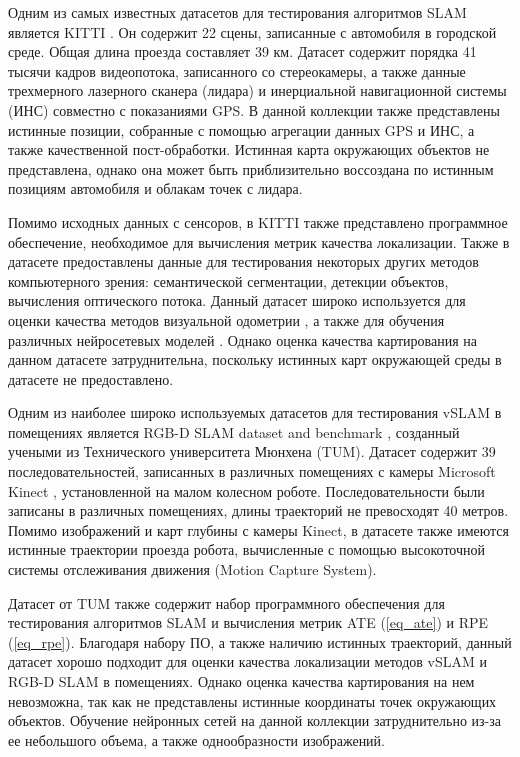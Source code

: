 \documentclass{mipt-thesis-ms}
\begin{document}
	Одним из самых известных датасетов для тестирования алгоритмов SLAM является KITTI \cite{geiger2012we}. Он содержит 22 сцены, записанные с автомобиля в городской среде. Общая длина проезда составляет 39 км. Датасет содержит порядка 41 тысячи кадров видеопотока, записанного со стереокамеры, а также данные трехмерного лазерного сканера (лидара) и инерциальной навигационной системы (ИНС) совместно с показаниями GPS. В данной коллекции также представлены истинные позиции, собранные с помощью агрегации данных GPS и ИНС, а также качественной пост-обработки. Истинная карта окружающих объектов не представлена, однако она может быть приблизительно воссоздана по истинным позициям автомобиля и облакам точек с лидара.
	
	Помимо исходных данных с сенсоров, в KITTI также представлено программное обеспечение, необходимое для вычисления метрик качества локализации. Также в датасете предоставлены данные для тестирования некоторых других методов компьютерного зрения: семантической сегментации, детекции объектов, вычисления оптического потока. Данный датасет широко используется для оценки качества методов визуальной одометрии \cite{geiger2015kitti}, а также для обучения различных нейросетевых моделей \cite{li2018megadepth} \cite{zhou2017unsupervised} \cite{patil2020don}. Однако оценка качества картирования на данном датасете затруднительна, поскольку истинных карт окружающей среды в датасете не предоставлено.
	
	Одним из наиболее широко используемых датасетов для тестирования vSLAM в помещениях является RGB-D SLAM dataset and benchmark \cite{sturm2012benchmark}, созданный учеными из Технического университета Мюнхена (TUM). Датасет содержит 39 последовательностей, записанных в различных помещениях с камеры Microsoft Kinect \cite{zhang2012microsoft}, установленной на малом колесном роботе. Последовательности были записаны в различных помещениях, длины траекторий не превосходят 40 метров. Помимо изображений и карт глубины с камеры Kinect, в датасете также имеются истинные траектории проезда робота, вычисленные с помощью высокоточной системы отслеживания движения (Motion Capture System).
	
	Датасет от TUM также содержит набор программного обеспечения для тестирования алгоритмов SLAM и вычисления метрик ATE (\ref{eq_ate}) и RPE (\ref{eq_rpe}). Благодаря набору ПО, а также наличию истинных траекторий, данный датасет хорошо подходит для оценки качества локализации методов vSLAM и RGB-D SLAM в помещениях. Однако оценка качества картирования на нем невозможна, так как не представлены истинные координаты точек окружающих объектов. Обучение нейронных сетей на данной коллекции затруднительно из-за ее небольшого объема, а также однообразности изображений.
	
\end{document}
